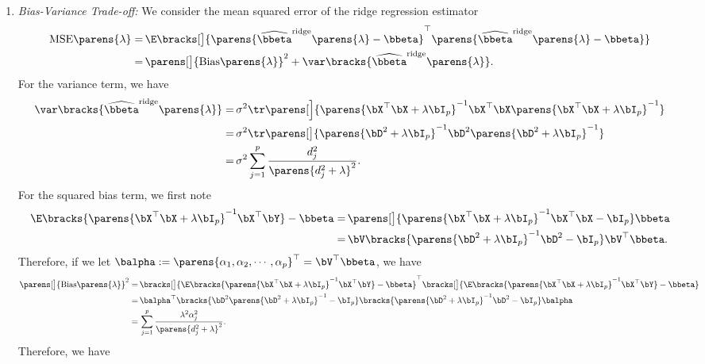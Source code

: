 \documentclass[12pt]{article}
\begin{document}
\begin{enumerate}[label=\textbf{\arabic*.}]
\begin{enumerate}
		\item \textit{Bias-Variance Trade-off:} We consider the mean squared error of the ridge regression estimator 
		\begin{align*}
			\mathrm{MSE} \parens{\lambda} = & \, \E \bracks[\big]{\parens{\widehat{\bbeta}^{\mathrm{ridge}} \parens{\lambda} - \bbeta}^\top \parens{\widehat{\bbeta}^{\mathrm{ridge}} \parens{\lambda} - \bbeta}} \\ 
			= & \, \parens[\big]{\mathrm{Bias} \parens{\lambda}}^2 + \var \bracks{\widehat{\bbeta}^{\mathrm{ridge}} \parens{\lambda}}. 
		\end{align*}
		For the variance term, we have 
		\begin{align*}
			\var \bracks{\widehat{\bbeta}^{\mathrm{ridge}} \parens{\lambda}} = & \, \sigma^2 \tr \parens[\Big]{\parens{\bX^\top \bX + \lambda \bI_p}^{-1} \bX^\top \bX \parens{\bX^\top \bX + \lambda \bI_p}^{-1}} \\ 
			= & \, \sigma^2 \tr \parens[\big]{\parens{\bD^2 + \lambda \bI_p}^{-1} \bD^2 \parens{\bD^2 + \lambda \bI_p}^{-1}} \\ 
			= & \, \sigma^2 \sum_{j=1}^p \frac{d_j^2}{\parens{d_j^2 + \lambda}^2}. 
		\end{align*}
		For the squared bias term, we first note 
		\begin{align*}
			\E \bracks{\parens{\bX^\top \bX + \lambda \bI_p}^{-1} \bX^\top \bY} - \bbeta 
			= & \, \parens[\big]{\parens{\bX^\top \bX + \lambda \bI_p}^{-1} \bX^\top \bX - \bI_p} \bbeta \\ 
			= & \, \bV \bracks{\parens{\bD^2 + \lambda \bI_p}^{-1} \bD^2 - \bI_p} \bV^\top \bbeta. 
		\end{align*}
		Therefore, if we let $\balpha := \parens{\alpha_1, \alpha_2, \cdots, \alpha_p}^\top = \bV^\top \bbeta$, we have 
		\begin{align*}
			\parens[\big]{\mathrm{Bias} \parens{\lambda}}^2 = & \, \bracks[\big]{\E \bracks{\parens{\bX^\top \bX + \lambda \bI_p}^{-1} \bX^\top \bY} - \bbeta}^\top \bracks[\big]{\E \bracks{\parens{\bX^\top \bX + \lambda \bI_p}^{-1} \bX^\top \bY} - \bbeta} \\ 
			= & \, \balpha^\top \bracks{\bD^2 \parens{\bD^2 + \lambda \bI_p}^{-1} - \bI_p} \bracks{\parens{\bD^2 + \lambda \bI_p}^{-1} \bD^2 - \bI_p} \balpha \\ 
			= & \, \sum_{j=1}^p \frac{\lambda^2 \alpha_j^2}{\parens{d_j^2 + \lambda}^2}. 
		\end{align*}
		Therefore, we have 
		\begin{align*}

\end{align*}
\end{enumerate}
\end{enumerate}
\end{document}
